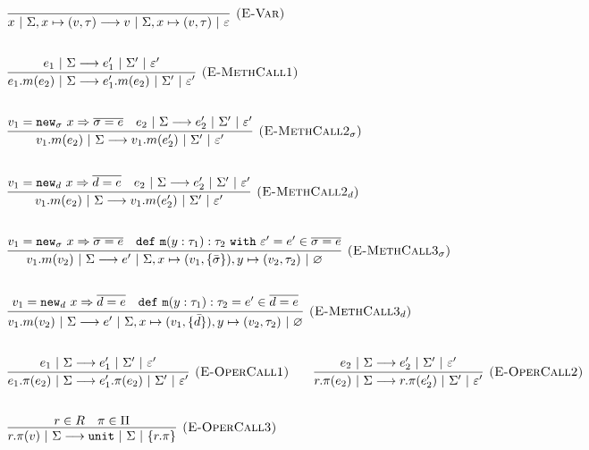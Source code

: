\documentclass{llncs}
\newcommand{\keywadj}[1]{\mathtt{#1}}
\newcommand{\keyw}[1]{\keywadj{#1}~}
\begin{document}
\[
\begin{array}{lll}

\begin{array}{lllr}

	\infer[\textsc{(E-Var)}]
		{x~|~\Sigma, x \mapsto (v, \tau) \longrightarrow v~|~\Sigma, x \mapsto (v, \tau)~|~\varepsilon}
		{} \\[5ex]

	\infer[\textsc{(E-MethCall1)}]
		{e_1.m(e_2)~|~\Sigma \longrightarrow e_1'.m(e_2)~|~\Sigma'~|~\varepsilon'}
		{e_1~|~\Sigma \longrightarrow e_1'~|~\Sigma'~|~\varepsilon'}\\[5ex]

	\infer[\textsc{(E-MethCall2$_{\sigma}$)}]
		{v_1.m(e_2)~|~\Sigma \longrightarrow v_1.m(e_2')~|~\Sigma'~|~\varepsilon'}
		{v_1 = \keywadj{new}_{\sigma}~x \Rightarrow \overline{\sigma = e} & e_2~|~\Sigma \longrightarrow e_2'~|~\Sigma'~|~\varepsilon'} \\[5ex]
				
	\infer[\textsc{(E-MethCall2$_d$)}]
		{v_1.m(e_2)~|~\Sigma \longrightarrow v_1.m(e_2')~|~\Sigma'~|~\varepsilon'}
		{v_1 = \keywadj{new}_{d}~x \Rightarrow \overline{d = e} & e_2~|~\Sigma \longrightarrow e_2'~|~\Sigma'~|~\varepsilon'}
		\\[5ex]
		
	\infer[\textsc{(E-MethCall3$_{\sigma}$)}]
		{v_1.m(v_2)~|~\Sigma
			\longrightarrow
		 e'~|~\Sigma, x \mapsto (v_1, \{\bar \sigma\}), y \mapsto (v_2, \tau_2)~|~\varnothing}
  		{v_1 = \keywadj{new}_{\sigma}~x \Rightarrow \overline{\sigma = e} & \keywadj{def~m}(y: \tau_1) : \tau_2~\keyw{with} \varepsilon' = e' \in \overline {\sigma = e}} \\[5ex]

	\infer[\textsc{(E-MethCall3$_{d}$)}]
		{v_1.m(v_2)~|~\Sigma
			\longrightarrow
		 e'~|~\Sigma, x \mapsto (v_1, \{ \bar d \}), y \mapsto (v_2, \tau_2)~|~\varnothing}
  		{v_1 = \keywadj{new}_{d}~x \Rightarrow \overline{d = e} & \keywadj{def~m}(y: \tau_1) : \tau_2 = e' \in \overline {d = e}} \\[5ex]
			
	\infer[\textsc{(E-OperCall1)}]
		{e_1.\pi(e_2)~|~\Sigma
			\longrightarrow
		 e_1'.\pi(e_2)~|~\Sigma'~|~\varepsilon'}
		{e_1~|~\Sigma \longrightarrow e_1'~|~\Sigma'~|~\varepsilon'}
~~~~~~
			\infer[\textsc{(E-OperCall2)}]
		{r.\pi(e_2)~|~\Sigma
			\longrightarrow
		 r.\pi(e_2')~|~\Sigma'~|~\varepsilon'}
		{e_2~|~\Sigma \longrightarrow e_2'~|~\Sigma'~|~\varepsilon'} \\[5ex]
			
			\infer[\textsc{(E-OperCall3)}]
		{r.\pi(v)~|~\Sigma
			\longrightarrow
		 \keywadj{unit}~|~\Sigma~|~\{r.\pi\}}
		{r \in R & \pi \in \Pi} \\[5ex]
		
\end{array}
\end{array}
\]
\end{document}
